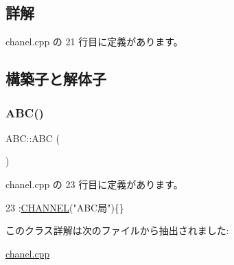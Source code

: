 \subsection{詳解}


 chanel.\+cpp の 21 行目に定義があります。



\subsection{構築子と解体子}
\mbox{\label{class_a_b_c_a1bea7fc9f73e0d6878f9d2ac9ef3c1ec}} 
\subsubsection{\texorpdfstring{A\+B\+C()}{ABC()}}
{\footnotesize\ttfamily A\+B\+C\+::\+A\+BC (\begin{DoxyParamCaption}{ }\end{DoxyParamCaption})\hspace{0.3cm}{\ttfamily [inline]}}



 chanel.\+cpp の 23 行目に定義があります。


\begin{DoxyCode}
23 :\hyperlink{class_c_h_a_n_n_e_l_a233c9484f865fee53d66da81fb6b9e2d}{CHANNEL}(\textcolor{stringliteral}{"ABC局"})\{\}
\end{DoxyCode}


このクラス詳解は次のファイルから抽出されました\+:\begin{DoxyCompactItemize}
\item 
\hyperlink{chanel_8cpp}{chanel.\+cpp}\end{DoxyCompactItemize}

